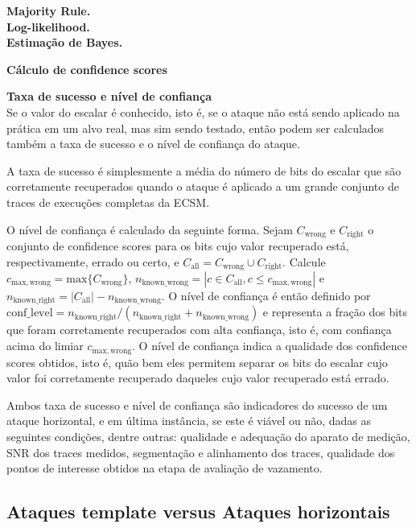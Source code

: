 \noindent \textbf{Majority Rule.}  \\

\noindent \textbf{Log-likelihood.}  \\

\noindent \textbf{Estimação de Bayes.} 

\noindent \textbf{Cálculo de confidence scores} 

\noindent \textbf{Taxa de sucesso e nível de confiança}\\
Se o valor do escalar é conhecido, isto é, se o ataque não está sendo aplicado na prática em um alvo real, mas sim sendo testado, então podem ser calculados também a taxa de sucesso e o nível de confiança do ataque. 

\noindent A taxa de sucesso é simplesmente a média do número de bits do escalar que são corretamente recuperados quando o ataque é aplicado a um grande conjunto de traces de execuções completas da ECSM.

\noindent O nível de confiança é calculado da seguinte forma. Sejam $C_\mathrm{wrong}$ e $C_\mathrm{right}$ o conjunto de confidence scores para os bits cujo valor recuperado está, respectivamente, errado ou certo, e $C_\mathrm{all} = C_\mathrm{wrong} \cup C_\mathrm{right} $.
%
Calcule $c_\mathrm{max,wrong} = \mathrm{max}\{C_\mathrm{wrong}\}$, $n_\mathrm{known\_wrong} = |{c \in C_\mathrm{all}, c\leq c_\mathrm{max,wrong}}|$  e $n_\mathrm{known\_right} = |C_\mathrm{all}| - n_\mathrm{known\_wrong}$.
%
O nível de confiança é então definido por $\mathrm{conf\_level} = n_\mathrm{known\_right} / (n_\mathrm{known\_right} + n_\mathrm{known\_wrong})$ e representa a fração dos bits que foram corretamente recuperados com alta confiança, isto é, com confiança acima do limiar $c_\mathrm{max,wrong}$.
%
O nível de confiança indica a qualidade dos confidence scores obtidos, isto é, quão bem eles permitem separar os bits do escalar cujo valor foi corretamente recuperado daqueles cujo valor recuperado está errado. 

\noindent Ambos taxa de sucesso e nível de confiança são indicadores do sucesso de um ataque horizontal, e em última instância, se este é viável ou não, dadas as seguintes condições, dentre outras: qualidade e adequação do aparato de medição, SNR dos traces medidos, segmentação e alinhamento dos traces, qualidade dos pontos de interesse obtidos na etapa de avaliação de vazamento.

\subsection{Ataques template versus Ataques horizontais}

